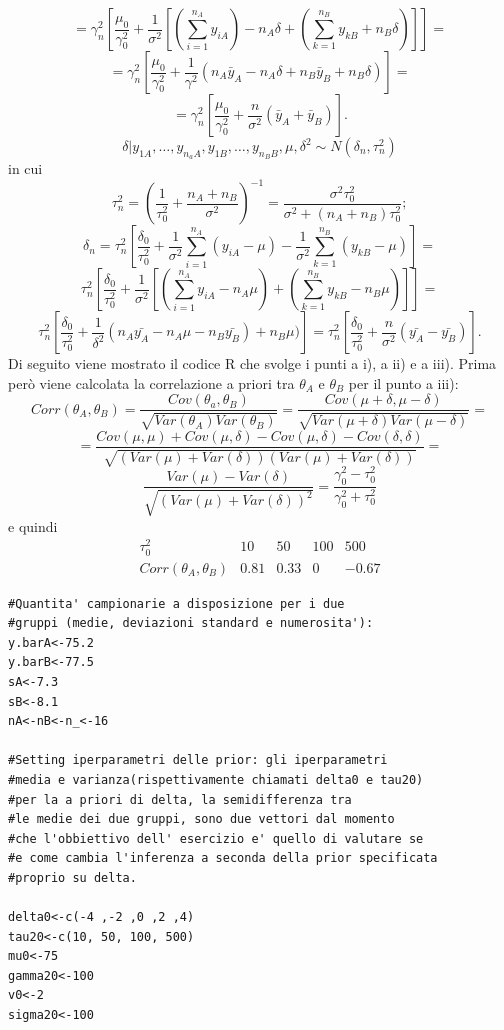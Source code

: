 \begin{itemize}
\[\]
\[
=\gamma_n^2[\frac{\mu_0}{\gamma_0^2}+\frac{1}{\sigma^2}[(\sum_{i=1}^{n_A}y_{iA}) - n_A\delta + (\sum_{k=1}^{n_B}y_{kB} + n_B\delta)]]=
\]
\[
= \gamma_n^2[\frac{\mu_0}{\gamma_0^2}+\frac{1}{\gamma^2}(n_A\bar{y}_A-n_A\delta+n_B\bar{y}_B+n_B\delta)] = 
\]
\[
=\gamma_n^2[\frac{\mu_0}{\gamma_0^2}+\frac{n}{\sigma^2}(\bar{y}_A+\bar{y}_B)].
\]
\[
\delta | y_{1A},\dots,y_{n_aA},y_{1B},\dots,y_{n_BB},\mu,\delta^2 \sim N(\delta_n,\tau_n^2)
\]
in cui
\[
\tau_n^2 = (\frac{1}{\tau_0^2}+\frac{n_A+n_B}{\sigma^2})^{-1} = \frac{\sigma^2\tau_0^2}{\sigma^2+(n_A+n_B)\tau_0^2};
\]
\[
\delta_n = \tau_n^2[\frac{\delta_0}{\tau_0^2}+\frac{1}{\sigma^2}\sum_{i=1}^{n_A}(y_{iA}-\mu)-\frac{1}{\sigma^2}\sum_{k=1}^{n_B}(y_{kB}-\mu)]=
\]
\[
\tau_n^2[\frac{\delta_0}{\tau_0^2}+\frac{1}{\sigma^2}[(\sum_{i=1}^{n_A}y_{iA}-n_A\mu)+(\sum_{k=1}^{n_B}y_{kB}-n_B\mu)]]=
\]
\[
\tau_n^2[\frac{\delta_0}{\tau_0^2}+\frac{1}{\delta^2}(n_A\bar{y_A}-n_A\mu-n_B\bar{y_B})+n_B\mu)]=\tau_n^2[\frac{\delta_0}{\tau_0^2}+\frac{n}{\sigma^2}(\bar{y_A}-\bar{y_B})].
\]
Di seguito viene mostrato il codice R che svolge i punti a i), a ii) e a iii). Prima però viene calcolata la correlazione a priori tra $\theta_A$ e $\theta_B$ per il punto a iii):
\[
Corr(\theta_A,\theta_B) = \frac{Cov(\theta_a,\theta_B)}{\sqrt{Var(\theta_A)Var(\theta_B)}} = \frac{Cov(\mu+\delta,\mu-\delta)}{\sqrt{Var(\mu+\delta)Var(\mu-\delta)}}=
\]
\[
= \frac{Cov(\mu,\mu)+Cov(\mu,\delta)-Cov(\mu,\delta)-Cov(\delta,\delta)}{\sqrt{(Var(\mu)+Var(\delta))(Var(\mu)+Var(\delta))}}=
\]
\[
\frac{Var(\mu)-Var(\delta)}{\sqrt{(Var(\mu)+Var(\delta))^2}}
=\frac{\gamma_0^2-\tau_0^2}{\gamma_0^2+\tau_0^2}
\]
e quindi
\[
 \begin{matrix}
  \tau_0^2 & 10 & 50 & 100 & 500 \\
  Corr(\theta_A,\theta_B) & 0.81 & 0.33 & 0 & -0.67
 \end{matrix}
\]

\begin{lstlisting}[style=R]
#Quantita' campionarie a disposizione per i due
#gruppi (medie, deviazioni standard e numerosita'):
y.barA<-75.2
y.barB<-77.5
sA<-7.3
sB<-8.1
nA<-nB<-n_<-16

#Setting iperparametri delle prior: gli iperparametri 
#media e varianza(rispettivamente chiamati delta0 e tau20) 
#per la a priori di delta, la semidifferenza tra
#le medie dei due gruppi, sono due vettori dal momento
#che l'obbiettivo dell' esercizio e' quello di valutare se 
#e come cambia l'inferenza a seconda della prior specificata 
#proprio su delta.

delta0<-c(-4 ,-2 ,0 ,2 ,4)
tau20<-c(10, 50, 100, 500)
mu0<-75
gamma20<-100
v0<-2
sigma20<-100


\end{lstlisting}
\end{itemize}
